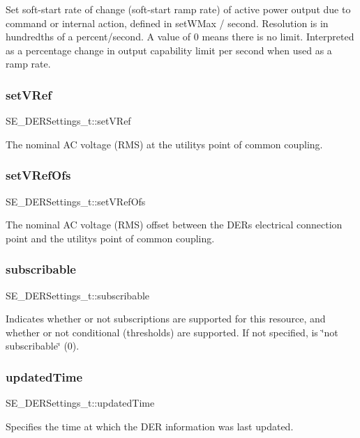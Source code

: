 Set soft-\/start rate of change (soft-\/start ramp rate) of active power output due to command or internal action, defined in set\+W\+Max / second. Resolution is in hundredths of a percent/second. A value of 0 means there is no limit. Interpreted as a percentage change in output capability limit per second when used as a ramp rate. \mbox{\label{group__DERSettings_gacd6deb80264d5c3dd884a43947686301}} 
\subsubsection{\texorpdfstring{set\+V\+Ref}{setVRef}}
{\footnotesize\ttfamily S\+E\+\_\+\+D\+E\+R\+Settings\+\_\+t\+::set\+V\+Ref}

The nominal AC voltage (R\+MS) at the utility\textquotesingle{}s point of common coupling. \mbox{\label{group__DERSettings_ga9b10fd8645e30e07ce49bda49d6cefc5}} 
\subsubsection{\texorpdfstring{set\+V\+Ref\+Ofs}{setVRefOfs}}
{\footnotesize\ttfamily S\+E\+\_\+\+D\+E\+R\+Settings\+\_\+t\+::set\+V\+Ref\+Ofs}

The nominal AC voltage (R\+MS) offset between the D\+ER\textquotesingle{}s electrical connection point and the utility\textquotesingle{}s point of common coupling. \mbox{\label{group__DERSettings_gab98f5df1cc2b74bce92993f9b25a0331}} 
\subsubsection{\texorpdfstring{subscribable}{subscribable}}
{\footnotesize\ttfamily S\+E\+\_\+\+D\+E\+R\+Settings\+\_\+t\+::subscribable}

Indicates whether or not subscriptions are supported for this resource, and whether or not conditional (thresholds) are supported. If not specified, is \char`\"{}not subscribable\char`\"{} (0). \mbox{\label{group__DERSettings_gabe364d4b64a470e7b43450c099bfeeb1}} 
\subsubsection{\texorpdfstring{updated\+Time}{updatedTime}}
{\footnotesize\ttfamily S\+E\+\_\+\+D\+E\+R\+Settings\+\_\+t\+::updated\+Time}

Specifies the time at which the D\+ER information was last updated. 